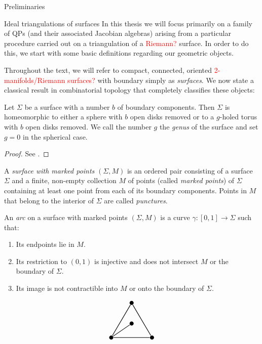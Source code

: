 \begin{chapter}{Preliminaries}
\begin{section}{Ideal triangulations of surfaces}
In this thesis we will focus primarily on a family of QPs (and their associated Jacobian algebras) arising from a particular procedure carried out on a triangulation of a \textcolor{red}{Riemann?} surface. In order to do this, we start with some basic definitions regarding our geometric objects.

Throughout the text, we will refer to compact, connected, oriented \textcolor{red}{2-manifolds/Riemann surfaces?} with boundary simply as \emph{surfaces}. We now state a classical result in combinatorial topology that completely classifies these objects:

\begin{prop}\label{surf-classification} Let $\Sigma$ be a surface with a number $b$ of boundary components. Then $\Sigma$ is homeomorphic to either a sphere with $b$ open disks removed or to a $g$-holed torus with $b$ open disks removed. We call the number $g$ the \emph{genus} of the surface and set $g=0$ in the spherical case.
\end{prop}
\begin{proof} See \cite[Section 10]{Mas77}.
\end{proof}

A \emph{surface with marked points} $(\Sigma,M)$ is an ordered pair consisting of a surface $\Sigma$ and a finite, non-empty collection $M$ of points (called \emph{marked points}) of $\Sigma$ containing at least one point from each of its boundary components. Points in $M$ that belong to the interior of $\Sigma$ are called \emph{punctures}.

An \emph{arc} on a surface with marked points $(\Sigma, M)$ is a curve $\gamma:[0,1]\to \Sigma$ such that:
\begin{enumerate}
\item Its endpoints lie in $M$.
\item Its restriction to $(0,1)$ is injective and does not intersect $M$ or the boundary of $\Sigma$.
\item Its image is not contractible into $M$ or onto the boundary of $\Sigma$.
\end{enumerate}
\begin{figure}[h]
\[
\begin{tikzpicture}[thick]
\tikzstyle{every node} = [circle, fill=black, minimum size=.2cm, inner sep=0cm]
\node (se1) at (0,0) {};
\node (sw1) at (2,0) {}
	edge (se1);
\node (n1) at (1,1.73) {}
	edge (se1)
	edge (sw1);
\node (c1) at (1,0.7) {}
	edge (se1);


\end{tikzpicture}\]
\end{figure}
\end{section}
\end{chapter}
